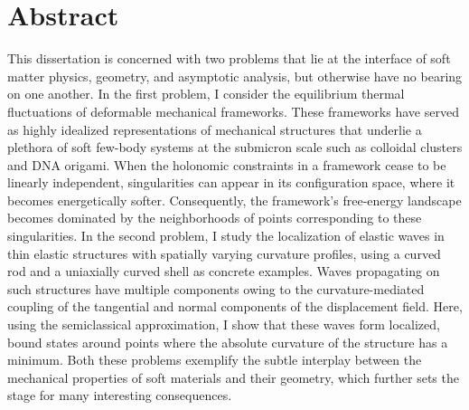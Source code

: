 


\frontmatter


\chapter*{Abstract}
\thispagestyle{empty}

This dissertation is concerned with two problems that lie at the interface of soft matter physics, geometry, and asymptotic analysis, but otherwise have no bearing on one another.
In the first problem, I consider the equilibrium thermal fluctuations of deformable mechanical frameworks.
These frameworks have served as highly idealized representations of mechanical structures that underlie a plethora of soft few-body systems at the submicron scale such as colloidal clusters and DNA origami.
When the holonomic constraints in a framework cease to be linearly independent, singularities can appear in its configuration space, where it becomes energetically softer.
Consequently, the framework's free-energy landscape becomes dominated by the neighborhoods of points corresponding to these singularities.
In the second problem, I study the localization of elastic waves in thin elastic structures with spatially varying curvature profiles, using a curved rod and a uniaxially curved shell as concrete examples.
Waves propagating on such structures have multiple components owing to the curvature-mediated coupling of the tangential and normal components of the displacement field.
Here, using the semiclassical approximation, I show that these waves form localized, bound states around points where the absolute curvature of the structure has a minimum.
Both these problems exemplify the subtle interplay between the mechanical properties of soft materials and their geometry, which further sets the stage for many interesting consequences.

\ifdeadtree
  \blankpage
\fi


\newpage\thispagestyle{empty}

